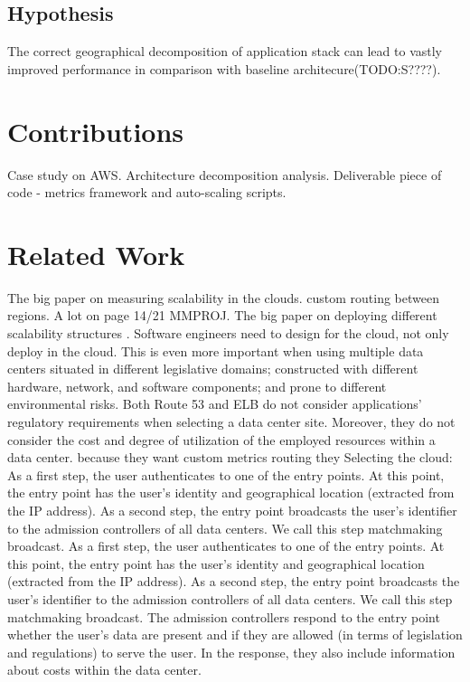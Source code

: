 \documentclass{uvamscse}
\begin{document}
\subsection{Hypothesis}
The correct geographical decomposition of application stack can lead to vastly improved performance in comparison with baseline architecure(TODO:S????).

\section{Contributions}
Case study on AWS.
Architecture decomposition analysis.
Deliverable piece of code - metrics framework and auto-scaling scripts.

\section{Related Work}
The big paper on measuring scalability in the clouds.
custom routing between regions. A lot on page 14/21 MMPROJ.
The big paper on deploying different scalability structures \cite{GroBuy}.
Software engineers need to design for the cloud, not only deploy in the cloud. This is even more important when using multiple data centers situated in different legislative domains; constructed with different hardware, network, and software components; and prone to different environmental risks.
Both Route 53 and ELB do not consider applications’ regulatory requirements when selecting a data center site. Moreover, they do not consider the cost and degree of utilization of the employed resources within a data center.
because they want custom metrics routing they
Selecting the cloud:
As a first step, the user authenticates to one of the entry points. At this point, the entry point has the user’s identity and geographical location (extracted from the IP address). As a second step, the entry point broadcasts the user’s identifier to the admission controllers of all data centers. We call this step matchmaking broadcast.
As a first step, the user authenticates to one of the entry points. At this point, the entry point has the user’s identity and geographical location (extracted from the IP address). As a second step, the entry point broadcasts the user’s identifier to the admission controllers of all data centers. We call this step matchmaking broadcast.
The admission controllers respond to the entry point whether the user’s data are present and if they are allowed (in terms of legislation and regulations) to serve the user. In the response, they also include information about costs within the data center.
\end{document}
